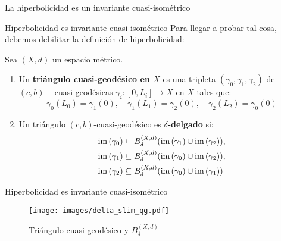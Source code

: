 \documentclass[xcolor=dvipsnames]{beamer}
\theoremstyle{largebreak}
\newcommand\cf[3]{\ensuremath{#1:#2\rightarrow#3}}
\newcommand{\im}[1]{\ensuremath{\textup{im}\left(#1\right)}}
\begin{document}
\begin{frame}
    \begin{center}
        \Large La hiperbolicidad es un invariante cuasi-isométrico
    \end{center}
\end{frame}

\begin{frame}{Hiperbolicidad es invariante cuasi-isométrico}
    Para llegar a probar tal cosa, debemos debilitar la definición de hiperbolicidad:
    
    \begin{mydef}
        Sea $(X,d)$ un espacio métrico.
        \begin{enumerate}[label = \textit{\arabic*}]
            \item Un \textbf{triángulo cuasi-geodésico en $X$} es una tripleta $(\gamma_0,\gamma_1,\gamma_2)$ de $(c,b)-$cuasi-geodésicas $\cf{\gamma_i}{[0,L_i]}{X}$ en $X$ tales que:
            \begin{equation*}
                \gamma_0(L_0)=\gamma_1(0),\quad \gamma_1(L_1)=\gamma_2(0),\quad \gamma_2(L_2)=\gamma_0(0)
            \end{equation*}
            \item Un triángulo $(c,b)$-cuasi-geodésico es \textbf{$\delta$-delgado} si:
            \begin{equation*}
                \begin{split}
                    \im{\gamma_0}&\subseteq B_{\delta}^{(X,d)}(\im{\gamma_1}\cup\im{\gamma_2}),\\
                    \im{\gamma_1}&\subseteq B_{\delta}^{(X,d)}(\im{\gamma_0}\cup\im{\gamma_2}),\\
                    \im{\gamma_2}&\subseteq B_{\delta}^{(X,d)}(\im{\gamma_0}\cup\im{\gamma_1})\\
                \end{split}
            \end{equation*}
        \end{enumerate}
    \end{mydef}
\end{frame}

\begin{frame}{Hiperbolicidad es invariante cuasi-isométrico}
    \begin{figure}
        \begin{center}
            \texttt{[image: images/delta\_slim\_qg.pdf]}
        \end{center}
        \caption{Triángulo cuasi-geodésico  y $B_\delta^{(X,d)}$}
    \end{figure}
\end{frame}
\end{document}
